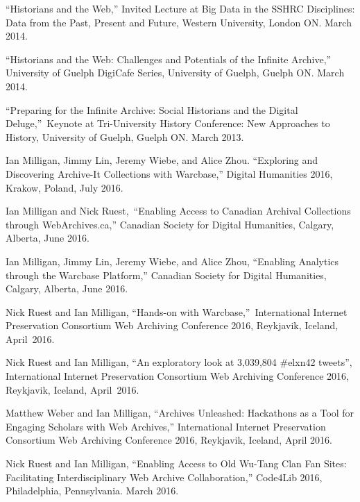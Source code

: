 \documentclass[11pt,article,oneside]{memoir}
\begin{document}
\ind ``Historians and the Web,'' Invited Lecture at Big Data in the SSHRC Disciplines: Data from the Past, Present and Future, Western University, London ON. March 2014.

\ind ``Historians and the Web: Challenges and Potentials of the Infinite Archive,'' University of Guelph DigiCafe Series, University of Guelph, Guelph ON. March 2014.

\ind ``Preparing for the Infinite Archive: Social Historians and the Digital Deluge,'' Keynote at Tri-University History Conference: New Approaches to History, University of Guelph, Guelph ON. March 2013.


\bigskip


\medskip

\ind Ian Milligan, Jimmy Lin, Jeremy Wiebe, and Alice Zhou. ``Exploring and Discovering Archive-It Collections with Warcbase,'' Digital Humanities 2016, Krakow, Poland, July 2016.

\ind Ian Milligan and Nick Ruest, ``Enabling Access to Canadian Archival Collections through WebArchives.ca,'' Canadian Society for Digital Humanities, Calgary, Alberta, June 2016. 

\ind Ian Milligan, Jimmy Lin, Jeremy Wiebe, and Alice Zhou, ``Enabling Analytics through the Warcbase Platform,'' Canadian Society for Digital Humanities, Calgary, Alberta, June 2016.

\ind Nick Ruest and Ian Milligan, ``Hands-on with Warcbase,'' International Internet Preservation Consortium Web Archiving Conference 2016, Reykjavik, Iceland, April 2016.

\ind Nick Ruest and Ian Milligan, ``An exploratory look at 3,039,804 \#elxn42 tweets'', International Internet Preservation Consortium Web Archiving Conference 2016, Reykjavik, Iceland, April 2016.

\ind Matthew Weber and Ian Milligan, ``Archives Unleashed: Hackathons as a Tool for Engaging Scholars with Web Archives,'' International Internet Preservation Consortium Web Archiving Conference 2016, Reykjavik, Iceland, April 2016.

\ind Nick Ruest and Ian Milligan, ``Enabling Access to Old Wu-Tang Clan Fan Sites: Facilitating Interdisciplinary Web Archive Collaboration,'' Code4Lib 2016, Philadelphia, Pennsylvania. March 2016. 
\end{document}
